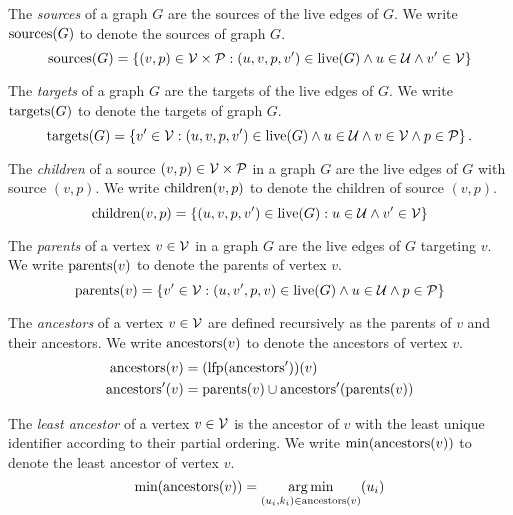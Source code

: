 \begin{definition}
  The \emph{sources} of a graph $G$ are the sources of the live edges of $G$.
  We write $\sources{G}$ to denote the sources of graph $G$.
  \[
    \sources{G} = \SetOf{(v, p) \in \V \times \P \SuchThat{(u, v, p, v') \in \live{G} \land u \in \U \land v' \in \V}}
  \]
\end{definition}

\begin{definition}
  The \emph{targets} of a graph $G$ are the targets of the live edges of $G$.
  We write $\targets{G}$ to denote the targets of graph $G$.
  \[
    \targets{G} = \SetOf{v' \in \V \SuchThat{(u, v, p, v') \in \live{G} \land u \in \U \land v \in \V \land p \in \P}}.
  \]
\end{definition}

\begin{definition}
  The \emph{children} of a source $(v, p) \in \V \times \P$ in a graph $G$
  are the live edges of $G$ with source $(v, p)$.
  We write $\children{v}{p}$ to denote the children of source $(v, p)$.
  \[
    \children{v}{p} = \SetOf{(u, v, p, v') \in \live{G} \SuchThat{u \in \U \land v' \in \V }}
  \]
\end{definition}

\begin{definition}
  The \emph{parents} of a vertex $v \in \V$ in a graph $G$ are the live edges of $G$ targeting $v$.
  We write $\parents{v}$ to denote the parents of vertex $v$.
  \[
    \parents{v} = \SetOf{v' \in \V \SuchThat{(u, v', p, v) \in \live{G} \land u \in \U \land p \in \P}}
  \]
\end{definition}

\begin{definition}
  The \emph{ancestors} of a vertex $v \in \V$ are defined recursively as the parents of $v$ and their ancestors.
  We write $\ancestors{v}$ to denote the ancestors of vertex $v$.
  \begin{align*}
    \ancestors{v} &= \mathopen{}\left( \lfp{\ancestorsPrimeOp} \right)\mathclose{}(v) \\
    \ancestorsPrime{v} &= \parents{v} \cup \ancestorsPrime{\parents{v}}
  \end{align*}
\end{definition}

\begin{definition}
  The \emph{least ancestor} of a vertex $v \in \V$ is the ancestor of $v$ with the least unique identifier according to their partial ordering.
  We write $\min{\ancestors{v}}$ to denote the least ancestor of vertex $v$.
  \[
    \min{\ancestors{v}} = \argmin{(u_i, k_i) \in \ancestors{v}}{u_i}
  \]
\end{definition}

